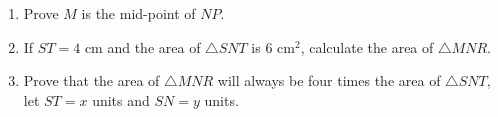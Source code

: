 \begin{eocexercises}{}
\begin{enumerate}[itemsep=20pt, label=\textbf{\arabic*}.]
\begin{center}
{}
\end{center}
\begin{enumerate}[noitemsep, label=\textbf{(\alph*)} ]
\item Prove $M$ is the mid-point of $NP$.
\item If $ST=4$ cm and the area of $\triangle SNT$ is $6$ cm$^2$, calculate the area of $\triangle MNR$.
\item Prove that the area of $\triangle MNR$ will always be four times the area of $\triangle SNT$, let $ST=x$ units and $SN=y$ units.
\end{enumerate}
\end{enumerate}

\end{eocexercises}
